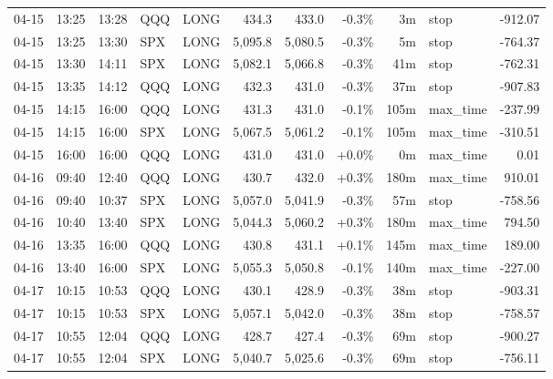 \documentclass[11pt,a4paper,twoside]{article}
\begin{document}
\begin{center}
\begin{longtable}{>{\color{txtmain}}l l l l l r r r r >{\color{txtmain}}l r}
04-15 & 13:25 & 13:28 & QQQ & LONG & 434.3 & 433.0 & \textcolor{lossred}{-0.3\%} & 3m & stop & \textcolor{lossred}{-912.07} \\
04-15 & 13:25 & 13:30 & SPX & LONG & 5,095.8 & 5,080.5 & \textcolor{lossred}{-0.3\%} & 5m & stop & \textcolor{lossred}{-764.37} \\
04-15 & 13:30 & 14:11 & SPX & LONG & 5,082.1 & 5,066.8 & \textcolor{lossred}{-0.3\%} & 41m & stop & \textcolor{lossred}{-762.31} \\
04-15 & 13:35 & 14:12 & QQQ & LONG & 432.3 & 431.0 & \textcolor{lossred}{-0.3\%} & 37m & stop & \textcolor{lossred}{-907.83} \\
04-15 & 14:15 & 16:00 & QQQ & LONG & 431.3 & 431.0 & \textcolor{lossred}{-0.1\%} & 105m & max\_time & \textcolor{lossred}{-237.99} \\
04-15 & 14:15 & 16:00 & SPX & LONG & 5,067.5 & 5,061.2 & \textcolor{lossred}{-0.1\%} & 105m & max\_time & \textcolor{lossred}{-310.51} \\
04-15 & 16:00 & 16:00 & QQQ & LONG & 431.0 & 431.0 & \textcolor{wingreen}{+0.0\%} & 0m & max\_time & \textcolor{wingreen}{0.01} \\
04-16 & 09:40 & 12:40 & QQQ & LONG & 430.7 & 432.0 & \textcolor{wingreen}{+0.3\%} & 180m & max\_time & \textcolor{wingreen}{910.01} \\
04-16 & 09:40 & 10:37 & SPX & LONG & 5,057.0 & 5,041.9 & \textcolor{lossred}{-0.3\%} & 57m & stop & \textcolor{lossred}{-758.56} \\
04-16 & 10:40 & 13:40 & SPX & LONG & 5,044.3 & 5,060.2 & \textcolor{wingreen}{+0.3\%} & 180m & max\_time & \textcolor{wingreen}{794.50} \\
04-16 & 13:35 & 16:00 & QQQ & LONG & 430.8 & 431.1 & \textcolor{wingreen}{+0.1\%} & 145m & max\_time & \textcolor{wingreen}{189.00} \\
04-16 & 13:40 & 16:00 & SPX & LONG & 5,055.3 & 5,050.8 & \textcolor{lossred}{-0.1\%} & 140m & max\_time & \textcolor{lossred}{-227.00} \\
04-17 & 10:15 & 10:53 & QQQ & LONG & 430.1 & 428.9 & \textcolor{lossred}{-0.3\%} & 38m & stop & \textcolor{lossred}{-903.31} \\
04-17 & 10:15 & 10:53 & SPX & LONG & 5,057.1 & 5,042.0 & \textcolor{lossred}{-0.3\%} & 38m & stop & \textcolor{lossred}{-758.57} \\
04-17 & 10:55 & 12:04 & QQQ & LONG & 428.7 & 427.4 & \textcolor{lossred}{-0.3\%} & 69m & stop & \textcolor{lossred}{-900.27} \\
04-17 & 10:55 & 12:04 & SPX & LONG & 5,040.7 & 5,025.6 & \textcolor{lossred}{-0.3\%} & 69m & stop & \textcolor{lossred}{-756.11} \\

\end{longtable}
\end{center}
\end{document}
